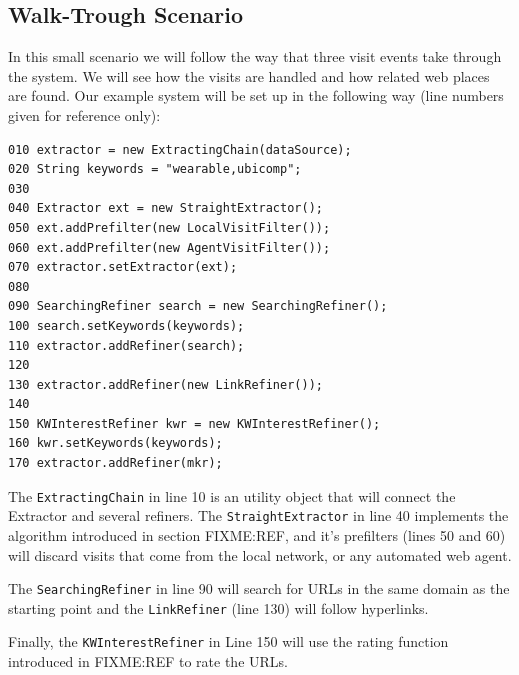 \documentclass[a4paper]{danarticle}
\theoremstyle{remark}
\begin{document}
    \subsection{Walk-Trough Scenario}
      In this small scenario we will follow the way that three visit events take 
      through the system. We will see how the visits are handled and how related 
      web places are found. Our example system will be set up in the following 
      way (line numbers given for reference only):
      \begin{verbatim}
010 extractor = new ExtractingChain(dataSource);
020 String keywords = "wearable,ubicomp";
030  
040 Extractor ext = new StraightExtractor();
050 ext.addPrefilter(new LocalVisitFilter());
060 ext.addPrefilter(new AgentVisitFilter());
070 extractor.setExtractor(ext);
080        
090 SearchingRefiner search = new SearchingRefiner();
100 search.setKeywords(keywords);
110 extractor.addRefiner(search);
120        
130 extractor.addRefiner(new LinkRefiner());
140                
150 KWInterestRefiner kwr = new KWInterestRefiner(); 
160 kwr.setKeywords(keywords); 
170 extractor.addRefiner(mkr); 
        \end{verbatim} 
        The \verb$ExtractingChain$ in line 10 is an utility object that will 
        connect the Extractor and several refiners. The \verb$StraightExtractor$ 
        in line 40 implements the algorithm introduced in section FIXME:REF, and 
        it's prefilters (lines 50 and 60) will discard visits that come from the 
        local network, or any automated web agent.
        
        The \verb$SearchingRefiner$ in line 90 will search for URLs in the same 
        domain as the starting point and the \verb$LinkRefiner$ (line 130) will 
        follow hyperlinks.
        
        Finally, the \verb$KWInterestRefiner$ in Line 150 will use the rating 
        function introduced in FIXME:REF to rate the URLs.
\end{document}
